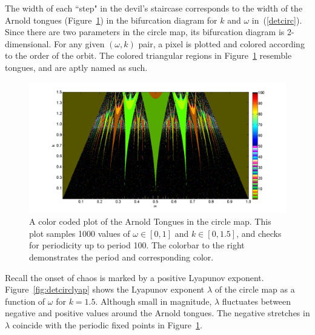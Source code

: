 The width of each ``step" in the devil's staircase corresponds to the width of the Arnold
tongues (Figure~\ref{fig:dettongues}) in the bifurcation diagram for
$k$ and $\omega$ in~(\ref{detcirc}). Since there are two parameters in
the circle map, its bifurcation diagram is 2-dimensional. For any
given $(\omega,k)$ pair, a pixel is plotted and colored according to the order of the orbit. The colored
triangular regions in Figure~\ref{fig:dettongues} resemble tongues,
and are aptly named as such. 
\begin{figure}[!h]
\caption[The Arnold tongues for the deterministic circle map]{A color coded
  plot of the Arnold Tongues in the circle map. This plot samples 1000 values of $\omega
  \in [0,1]$ and $k \in
  [0,1.5]$, and checks for periodicity up to period 100. The colorbar
  to the right demonstrates the period and corresponding
  color.}\label{fig:dettongues}
	\begin{center}
		\includegraphics[scale=0.45]{figs/tongues_1000_det.png}
	\end{center}
\end{figure}
Recall the onset of chaos is marked by a positive Lyapunov
exponent. Figure~\ref{fig:detcirclyap} shows the Lyapunov exponent
$\lambda$ of
the circle map as a function of $\omega$ for $k=1.5$. Although small in
magnitude, $\lambda$ fluctuates between negative and positive
values around the Arnold tongues. The negative stretches in $\lambda$
coincide with the periodic fixed points in Figure~\ref{fig:dettongues}.  
